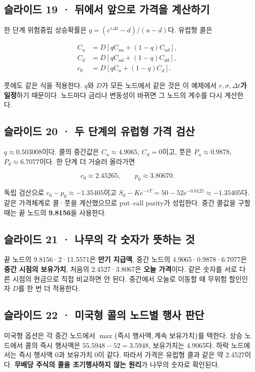 \documentclass[11pt,a4paper]{article}
\begin{document}
\subsection{슬라이드 19 · 뒤에서 앞으로 가격을 계산하기}
한 단계 위험중립 상승확률은 $q=(e^{r\Delta t}-d)/(u-d)$다. 유럽형 콜은\par

\[
\begin{aligned}
C_u&=D[qC_{uu}+(1-q)C_{ud}],\\
C_d&=D[qC_{ud}+(1-q)C_{dd}],\\
c_0&=D[qC_u+(1-q)C_d].
\end{aligned}
\]

풋에도 같은 식을 적용한다. $q$와 $D$가 모든 노드에서 같은 것은 이 예제에서 \textbf{$r,\sigma,\Delta t$가 일정}하기 때문이다. 노드마다 금리나 변동성이 바뀌면 그 노드의 계수를 다시 계산한다.\par

\subsection{슬라이드 20 · 두 단계의 유럽형 가격 검산}
$q\approx0.503008$이다. 콜의 중간값은 $C_u\approx4.9065$, $C_d=0$이고, 풋은 $P_u\approx0.9878$, $P_d\approx6.7077$이다. 한 단계 더 거슬러 올라가면\par

\[
c_0\approx2.45265,\qquad p_0\approx3.80670.
\]

독립 검산으로 $c_0-p_0\approx-1.35405$이고 $S_0-Ke^{-rT}=50-52e^{-0.0125}\approx-1.35405$다. 같은 가격체계로 콜·풋을 계산했으므로 put–call parity가 성립한다. 중간 콜값을 구할 때는 끝 노드의 \textbf{9.8156}을 사용한다.\par

\subsection{슬라이드 21 · 나무의 각 숫자가 뜻하는 것}
끝 노드의 9.8156·2·11.5571은 \textbf{만기 지급액}, 중간 노드의 4.9065·0.9878·6.7077은 \textbf{중간 시점의 보유가치}, 처음의 2.4527·3.8067은 \textbf{오늘 가격}이다. 같은 숫자를 서로 다른 시점의 현금으로 직접 비교하면 안 된다. 중간에서 오늘로 이동할 때 무위험 할인인자 $D$를 한 번 더 적용한다.\par

\subsection{슬라이드 22 · 미국형 콜의 노드별 행사 판단}
미국형 옵션은 각 중간 노드에서 $\max\{\text{즉시 행사액},\text{계속 보유가치}\}$를 택한다. 상승 노드에서 콜의 즉시 행사액은 $55.5948-52=3.5948$, 보유가치는 4.9065다. 하락 노드에서는 즉시 행사액 0과 보유가치 0이 같다. 따라서 가격은 유럽형 콜과 같은 약 2.4527이다. \textbf{무배당 주식의 콜을 조기행사하지 않는 원리}가 나무의 숫자로 확인된다.\par
\end{document}
